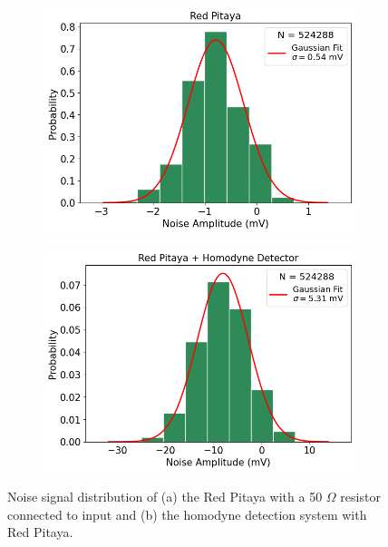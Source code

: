 \begin{figure}[ht]
    \centering
    \begin{subfigure}[t]{0.47\linewidth}
        \centering
        \includegraphics[width=\textwidth]{images/chapter_2/2_noise/distr_rp.png}
        \caption{}
        \label{fig:ch2_signal_distr}
    \end{subfigure}
    \hspace{.025\linewidth}
    \begin{subfigure}[t]{0.48\linewidth}
        \centering
        \includegraphics[width=\textwidth]{images/chapter_2/2_noise/distr_homo.png}
        \caption{}
        \label{fig:ch2_spectrum_distr}
    \end{subfigure}
    \caption{Noise signal distribution of (a) the Red Pitaya with a 50 $\Omega$ resistor connected to input and (b) the homodyne detection system with Red Pitaya.}
    \label{fig:ch2_distribution}
\end{figure}

